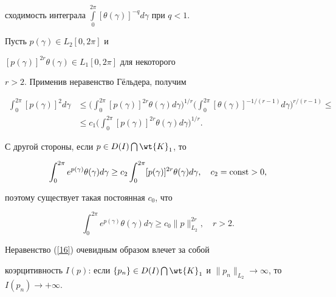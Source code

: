 сходимость интеграла $\int\limits_{0}^{2\pi}


[\theta(\gamma)]^{-q}d\gamma$ при $q<1$.





Пусть $p(\gamma)\in L_2 [0, 2\pi]$ и


$[p(\gamma)]^{2r}\theta(\gamma)\in L_1 [0, 2\pi]$ для некоторого


$r>2$. Применив неравенство Г\"ельдера, получим


\begin{align*}


\int_{0}^{2\pi}[p(\gamma)]^{2}d\gamma&\leq\bigg(


\int_{0}^{2\pi}[p(\gamma)]^{2r}\theta(\gamma)d\gamma\bigg)^{1/r}


\bigg(\int_{0}^{2\pi}[\theta(\gamma)]^{-1/(r-1)}d\gamma\bigg)^{r/(r-1)}\leq \\


%


&\leq c_{1} \bigg(


\int_{0}^{2\pi}[p(\gamma)]^{2r}\theta(\gamma)d\gamma\bigg)^{1/r}.


\end{align*}


С другой стороны, если $p\in D(I)\bigcap \wt{K}_{1}$, то


$$


\int_{0}^{2\pi}e^{p(\gamma)} \theta(\gamma)d\gamma \geq c_{2}


\int_{0}^{2\pi}[p(\gamma)]^{2r}\theta(\gamma)d\gamma, \quad


c_{2}=\const>0,


$$


поэтому существует такая постоянная $c_{0}$, что


\begin{equation}\label{16}


\int_{0}^{2\pi}e^{p(\gamma)}\theta(\gamma)d\gamma \geq


c_{0}\| p \|^{2r}_{L_2}, \quad r>2.


\end{equation}


Неравенство (\ref{16}) очевидным образом влечет за собой


коэрцитивность $I(p)$: если $\{p_{n}\} \in D(I)\bigcap


\wt{K}_{1}$ и $\| p_{n}


\|_{L_2}\to\infty$, то $I(p_{n})\to +\infty$.





